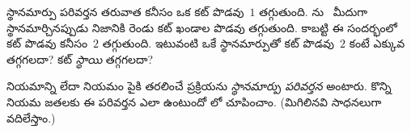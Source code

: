 \documentclass[../../../include/open-logic-section]{subfiles}
\begin{document}
\begin{prob}
స్థానమార్పు పరివర్తన తరువాత కనీసం ఒక కట్ పొడవు~$1$ తగ్గుతుంది. \Elim{\land}ను~\Elim{\lor} మీదుగా స్థానమార్చినప్పుడు నిజానికి రెండు కట్ ఖండాల పొడవు తగ్గుతుంది. కాబట్టి ఈ సందర్భంలో  కట్ పొడవు కనీసం~$2$ తగ్గుతుంది. ఇటువంటి ఒకే స్థానమార్పుతో  కట్ పొడవు~$2$ కంటే ఎక్కువ తగ్గగలదా? కట్ \emph{స్థాయి} తగ్గగలదా?
\end{prob}

 నియమాన్ని \Elim{\lor} లేదా \Elim{\lexists} నియమం పైకి తరలించే ప్రక్రియను \emph{స్థానమార్పు పరివర్తన} అంటారు. కొన్ని నియమ జతలకు ఈ పరివర్తన ఎలా ఉంటుందో లో చూపించాం. (మిగిలినవి సాధనలుగా వదిలేస్తాం.)

\end{document}
